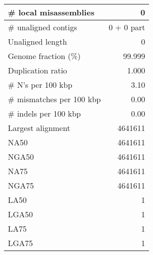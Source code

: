 \documentclass[12pt,a4paper]{article}
\begin{document}
\begin{table}[ht]
\begin{center}
\begin{tabular}{|l*{1}{|r}|}
\# local misassemblies & 0 \\ \hline
\# unaligned contigs & 0 + 0 part \\ \hline
Unaligned length & 0 \\ \hline
Genome fraction (\%) & 99.999 \\ \hline
Duplication ratio & 1.000 \\ \hline
\# N's per 100 kbp & 3.10 \\ \hline
\# mismatches per 100 kbp & 0.00 \\ \hline
\# indels per 100 kbp & 0.00 \\ \hline
Largest alignment & 4641611 \\ \hline
NA50 & 4641611 \\ \hline
NGA50 & 4641611 \\ \hline
NA75 & 4641611 \\ \hline
NGA75 & 4641611 \\ \hline
LA50 & 1 \\ \hline
LGA50 & 1 \\ \hline
LA75 & 1 \\ \hline
LGA75 & 1 \\ \hline
\end{tabular}
\end{center}
\end{table}
\end{document}
